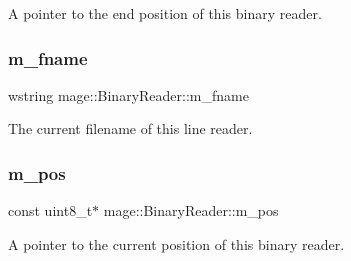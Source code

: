 A pointer to the end position of this binary reader. \hypertarget{classmage_1_1_binary_reader_a9c97c02d53ce60a9952751ad4f55414f}{}\label{classmage_1_1_binary_reader_a9c97c02d53ce60a9952751ad4f55414f} 
\subsubsection{\texorpdfstring{m\+\_\+fname}{m\_fname}}
{\footnotesize\ttfamily wstring mage\+::\+Binary\+Reader\+::m\+\_\+fname\hspace{0.3cm}{\ttfamily [private]}}

The current filename of this line reader. \hypertarget{classmage_1_1_binary_reader_a086c8b8615dddb15a97acf657bb4d73b}{}\label{classmage_1_1_binary_reader_a086c8b8615dddb15a97acf657bb4d73b} 
\subsubsection{\texorpdfstring{m\+\_\+pos}{m\_pos}}
{\footnotesize\ttfamily const uint8\+\_\+t$\ast$ mage\+::\+Binary\+Reader\+::m\+\_\+pos\hspace{0.3cm}{\ttfamily [private]}}

A pointer to the current position of this binary reader. 